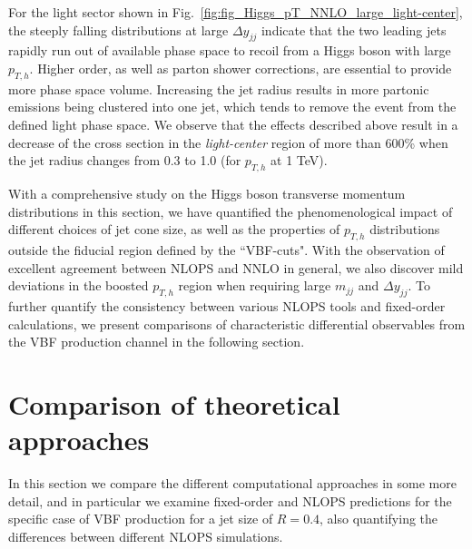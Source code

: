 \documentclass[10pt,prd,fleqn,superscriptaddress,notitlepage,nofootinbib,preprintnumbers,nobalancelastpage]{revtex4-1}
\newcommand{\VBF}{VBF\xspace}
\begin{document}
For the light sector shown in Fig.~\ref{fig:fig_Higgs_pT_NNLO_large_light-center}, the steeply falling  distributions at large $\Delta y_{jj}$  indicate that the two leading jets rapidly run out of available phase space  to recoil from a Higgs boson with large $p_{T,h}$. Higher order, as well as parton shower corrections, are essential to provide more phase space volume.
Increasing the jet radius results in more partonic emissions being clustered into one jet, which  tends to remove the event from the defined  light phase space.
We observe that the effects described above result in  a decrease of the cross section in the \textit{light-center} region  of more than 600\% when the jet radius changes from 0.3 to 1.0 (for $p_{T,h}$ at 1 TeV).

With a comprehensive study on the Higgs boson transverse momentum distributions in this section, we have quantified the phenomenological impact of different choices of jet cone size, as well as the properties of $p_{T,h}$ distributions outside the fiducial region defined by the ``VBF-cuts". With the observation of excellent agreement between NLOPS and NNLO in general, we also discover mild deviations in the boosted $p_{T,h}$ region when requiring large $m_{jj}$ and $\Delta y_{jj}$. To further quantify the consistency between various NLOPS tools and fixed-order calculations, we present comparisons of characteristic differential observables from the VBF production channel in the following section.

\section{Comparison of theoretical approaches}
\label{sec:tools}
In this section we compare the different computational approaches in some more detail, and in particular we examine
fixed-order and NLOPS predictions for the specific case of \VBF production for a jet size of $R=0.4$,
also quantifying the differences between different NLOPS simulations.
\end{document}
